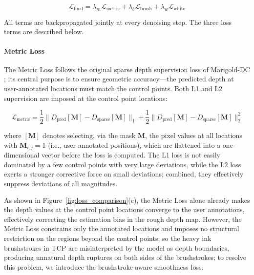 \begin{equation}
  \mathcal{L}_{\mathrm{final}} =
    \lambda_m \mathcal{L}_{\mathrm{metric}} +
    \lambda_b \mathcal{L}_{\mathrm{brush}} +
    \lambda_w \mathcal{L}_{\mathrm{white}}
  \label{eq:cpl_final}
\end{equation}

All terms are backpropagated jointly at every denoising step.
The three loss terms are described below.

\paragraph{Metric Loss}

The Metric Loss follows the original sparse depth supervision loss of Marigold-DC \cite{marigolddc};
its central purpose is to ensure geometric accuracy---the predicted depth at user-annotated locations must match the control points.
Both L1 and L2 supervision are imposed at the control point locations:

\begin{equation}
  \mathcal{L}_{\mathrm{metric}} =
    \frac{1}{2}\bigl\| D_{\mathrm{pred}}[\mathbf{M}] - D_{\mathrm{sparse}}[\mathbf{M}] \bigr\|_1 +
    \frac{1}{2}\bigl\| D_{\mathrm{pred}}[\mathbf{M}] - D_{\mathrm{sparse}}[\mathbf{M}] \bigr\|_2^2
\end{equation}

where $[\mathbf{M}]$ denotes selecting, via the mask $\mathbf{M}$, the pixel values at all locations with $\mathbf{M}_{i,j}=1$
(i.e., user-annotated positions), which are flattened into a one-dimensional vector before the loss is computed.
The L1 loss is not easily dominated by a few control points with very large deviations, while the L2 loss exerts a stronger corrective force on small deviations;
combined, they effectively suppress deviations of all magnitudes.

As shown in Figure~\ref{fig:loss_comparison}(c),
the Metric Loss alone already makes the depth values at the control point locations converge to the user annotations,
effectively correcting the estimation bias in the rough depth map.
However, the Metric Loss constrains only the annotated locations
and imposes no structural restriction on the regions beyond the control points,
so the heavy ink brushstrokes in TCP are misinterpreted by the model as depth boundaries,
producing unnatural depth ruptures on both sides of the brushstrokes;
to resolve this problem, we introduce the brushstroke-aware smoothness loss.


